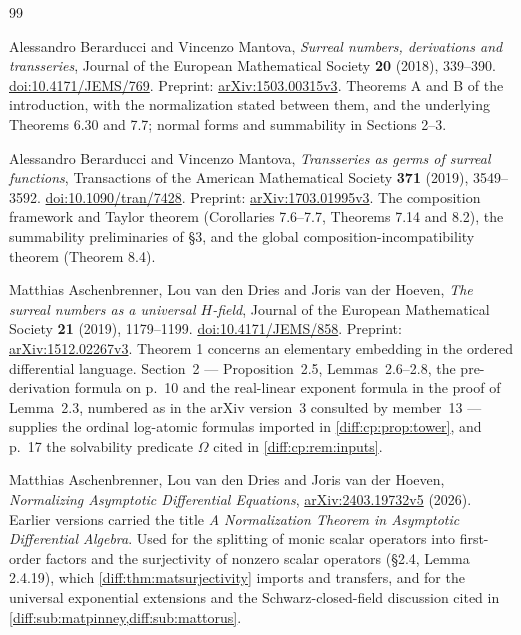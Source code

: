 \documentclass[11pt,letterpaper]{article}
\numberwithin{equation}{section}
\theoremstyle{definition}
\theoremstyle{remark}
\begin{document}
\clearpage
{}
{}
\begin{thebibliography}{99}\small\raggedright

Alessandro Berarducci and Vincenzo Mantova,
\emph{Surreal numbers, derivations and transseries},
Journal of the European Mathematical Society \textbf{20} (2018), 339--390.
\href{https://doi.org/10.4171/JEMS/769}{doi:10.4171/JEMS/769}.
Preprint: \href{https://arxiv.org/abs/1503.00315v3}{arXiv:1503.00315v3}.
Theorems A and B of the introduction, with the normalization stated between
them, and the underlying Theorems 6.30 and 7.7; normal forms and summability
in Sections 2--3.

Alessandro Berarducci and Vincenzo Mantova,
\emph{Transseries as germs of surreal functions},
Transactions of the American Mathematical Society \textbf{371} (2019),
3549--3592.
\href{https://doi.org/10.1090/tran/7428}{doi:10.1090/tran/7428}.
Preprint: \href{https://arxiv.org/abs/1703.01995}{arXiv:1703.01995v3}.
The composition framework and Taylor theorem (Corollaries 7.6--7.7, Theorems
7.14 and 8.2), the summability preliminaries of \S3, and the global
composition-incompatibility theorem (Theorem 8.4).

Matthias Aschenbrenner, Lou van den Dries and Joris van der Hoeven,
\emph{The surreal numbers as a universal $H$-field},
Journal of the European Mathematical Society \textbf{21} (2019), 1179--1199.
\href{https://doi.org/10.4171/JEMS/858}{doi:10.4171/JEMS/858}.
Preprint: \href{https://arxiv.org/abs/1512.02267v3}{arXiv:1512.02267v3}.
Theorem 1 concerns an elementary embedding in the ordered differential
language. Section~2 --- Proposition~2.5, Lemmas~2.6--2.8, the pre-derivation
formula on p.~10 and the real-linear exponent formula in the proof of
Lemma~2.3, numbered as in the arXiv version~3 consulted by member~13 --- supplies
the ordinal log-atomic formulas imported in \cref{diff:cp:prop:tower}, and
p.~17 the solvability predicate $\Omega$ cited in \cref{diff:cp:rem:inputs}.

Matthias Aschenbrenner, Lou van den Dries and Joris van der Hoeven,
\emph{Normalizing Asymptotic Differential Equations},
\href{https://arxiv.org/abs/2403.19732v5}{arXiv:2403.19732v5} (2026).
Earlier versions carried the title \emph{A Normalization Theorem in Asymptotic
Differential Algebra}. Used for the splitting of monic scalar operators into
first-order factors and the surjectivity of nonzero scalar operators
(\S2.4, Lemma 2.4.19), which \cref{diff:thm:matsurjectivity} imports and
transfers, and for the universal exponential extensions and the
Schwarz-closed-field discussion cited in
\cref{diff:sub:matpinney,diff:sub:mattorus}.


\end{thebibliography}
\end{document}

